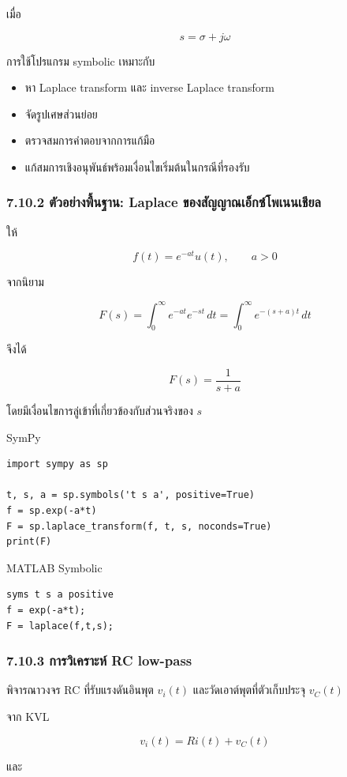 เมื่อ

\[
s=\sigma+j\omega
\]

การใช้โปรแกรม symbolic เหมาะกับ

\begin{itemize}
    \item หา Laplace transform และ inverse Laplace transform
    \item จัดรูปเศษส่วนย่อย
    \item ตรวจสมการคำตอบจากการแก้มือ
    \item แก้สมการเชิงอนุพันธ์พร้อมเงื่อนไขเริ่มต้นในกรณีที่รองรับ
\end{itemize}

\subsubsection{7.10.2 ตัวอย่างพื้นฐาน: Laplace ของสัญญาณเอ็กซ์โพเนนเชียล}

ให้

\[
f(t)=e^{-at}u(t),\qquad a>0
\]

จากนิยาม

\[
F(s)=\int_0^\infty e^{-at}e^{-st}\,dt
=\int_0^\infty e^{-(s+a)t}\,dt
\]

จึงได้

\[
F(s)=\frac{1}{s+a}
\]

โดยมีเงื่อนไขการลู่เข้าที่เกี่ยวข้องกับส่วนจริงของ $s$

SymPy

\begin{verbatim}
import sympy as sp

t, s, a = sp.symbols('t s a', positive=True)
f = sp.exp(-a*t)
F = sp.laplace_transform(f, t, s, noconds=True)
print(F)
\end{verbatim}

MATLAB Symbolic

\begin{verbatim}
syms t s a positive
f = exp(-a*t);
F = laplace(f,t,s);
\end{verbatim}

\subsubsection{7.10.3 การวิเคราะห์ RC low-pass}

พิจารณาวงจร RC ที่รับแรงดันอินพุต $v_i(t)$ และวัดเอาต์พุตที่ตัวเก็บประจุ $v_C(t)$

จาก KVL

\[
v_i(t)=Ri(t)+v_C(t)
\]

และ


